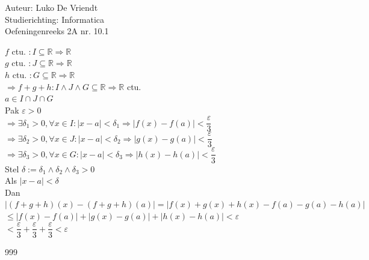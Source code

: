 \documentclass[a4paper]{article}
\begin{document}
\noindent \large Auteur: Luko De Vriendt\\
\noindent \large Studierichting: Informatica\\
\noindent \large Oefeningenreeks 2A nr. 10.1\\

\medskip

\normalsize

$f$ ctu. $: I \subseteq \mathbb{R} \Rightarrow \mathbb{R} $\\

$g$ ctu. $: J \subseteq \mathbb{R} \Rightarrow \mathbb{R} $\\

$h$ ctu. $: G \subseteq \mathbb{R} \Rightarrow \mathbb{R} $\\

$\Rightarrow f + g + h : I \wedge J \wedge G \subseteq \mathbb{R} \Rightarrow \mathbb{R} $ ctu. \\

$a \in  I \cap J \cap G$ \\

Pak $\varepsilon > 0$ \\

$\Rightarrow \exists \delta_1 > 0, \forall x \in I : \left| x-a \right| < \delta_1 \Rightarrow \left| f(x)-f(a) \right| < \dfrac{\varepsilon}{3}$ \\

$\Rightarrow \exists \delta_2 > 0, \forall x \in J : \left| x-a \right| < \delta_2 \Rightarrow \left| g(x)-g(a) \right| < \dfrac{\varepsilon}{3}$ \\

$\Rightarrow \exists \delta_3 > 0, \forall x \in G : \left| x-a \right| < \delta_3 \Rightarrow \left| h(x)-h(a) \right| < \dfrac{\varepsilon}{3}$ \\

Stel $\delta := \delta_1 \wedge \delta_2 \wedge \delta_3 > 0$ \\

Als $\left| x-a \right| < \delta$ \\

Dan $\left| (f+g+h)(x)-(f+g+h)(a) \right| = \left| f(x)+g(x)+h(x)-f(a)-g(a)-h(a)\right|$ \\

$\leq \left| f(x)-f(a) \right| + \left| g(x)-g(a) \right| + \left| h(x)-h(a) \right| < \varepsilon$ \\

$ <\dfrac{\varepsilon}{3} + \dfrac{\varepsilon}{3} + \dfrac{\varepsilon}{3} < \varepsilon$ \\


\begin{thebibliography}{999}
\end{thebibliography}
\end{document}

